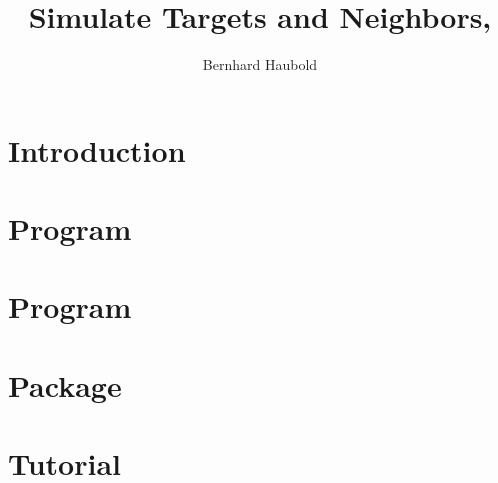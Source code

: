 \documentclass[a4paper]{report}
\begin{document}
\pagestyle{noweb}

\title{Simulate Targets and Neighbors, }
\author{Bernhard Haubold}
\maketitle
\tableofcontents
\chapter{Introduction}

\chapter{Program }

\chapter{Program }

\chapter{Package }

\chapter{Tutorial}



\end{document}
